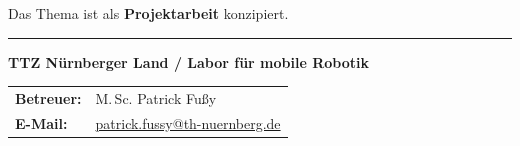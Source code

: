 \documentclass{ohm_project_description}
\begin{document}
\vspace{0.5cm}
Das Thema ist als \textbf{Projektarbeit} konzipiert.

\vfill
\textcolor{ohm_red}{\rule{\linewidth}{0.4mm}}
\textbf{\textcolor{ohm_red}{TTZ Nürnberger Land / Labor für mobile Robotik}} \\
\begin{tabular}{@{}ll}
\textbf{Betreuer:} & M.\,Sc. Patrick Fußy \\
\textbf{E-Mail:}   & \href{mailto:patrick.fussy@th-nuernberg.de}{patrick.fussy@th-nuernberg.de} \\
\end{tabular}
\end{document}
